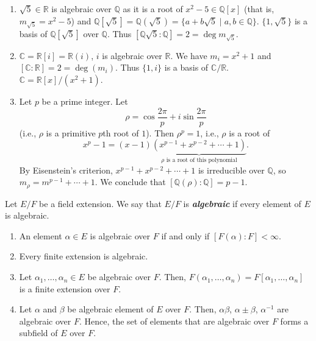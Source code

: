 \documentclass[twoside]{article}
\newcommand\Q{\mathbb Q}
\newcommand\R{\mathbb R}
\newcommand\C{\mathbb C}
\theoremstyle{remark}
\newcommand*\term[1]{\textbf{\textit{\mathversion{bold}#1}}}
\begin{document}
\begin{examples}
  \begin{enumerate}[label=\arabic*.]
    \item \(\sqrt 5 \in \R\) is algebraic over \(\Q\) as it is a root of \(x^2-5 \in \Q[x]\) (that is, \(m_{\sqrt 5} = x^2-5\)) and \(\Q[\sqrt{5}] = \Q(\sqrt{5}) = \{a + b\sqrt 5 \mid a,b \in \Q\}\). \(\{1,\sqrt5\}\) is a basis of \(\Q[\sqrt5]\) over \(\Q\). Thus \([\Q\sqrt5 : \Q] = 2 = \deg m_{\sqrt5}\).
    \item \(\C = \R[i] = \R(i)\), \(i\) is algebraic over \(\R\). We have \(m_i = x^2+1\) and \([\C : \R] = 2 = \deg(m_i)\). Thus \(\{1, i\}\) is a basis of \(\C/\R\). \(\C = \R[x]/(x^2+1)\).
    \item Let \(p\) be a prime integer. Let
    \[ \rho = \cos \frac{2\pi}p + i \sin \frac{2\pi}p \]
    (i.e., \(\rho\) is a primitive \(p\)th root of \(1\)). Then \(\rho^p = 1\), i.e., \(\rho\) is a root of
    \[ x^p-1 = (x-1) \underbrace{(x^{p-1} + x^{p-2} + \cdots + 1)}_{\text{\(\rho\) is a root of this polynomial}}. \]
    By Eisenstein's criterion, \(x^{p-1} + x^{p-2} + \cdots + 1\) is irreducible over \(\Q\), so \(m_\rho = m^{p-1} + \cdots + 1\). We conclude that \([\Q(\rho) : \Q] = p-1\).
  \end{enumerate}
\end{examples}

%
Let \(E/F\) be a field extension. We say that \(E/F\) is \term{algebraic} if every element of \(E\) is algebraic.

\begin{corollary}
  \begin{enumerate}[label=\textup{(\arabic*)}, nosep]
    \item An element \(\alpha \in E\) is algebraic over \(F\) if and only if \([F(\alpha) : F] < \infty\).
    \item Every finite extension is algebraic.
    \item Let \(\alpha_1, \dots, \alpha_n \in E\) be algebraic over \(F\). Then, \(F(\alpha_1, \dots, \alpha_n) = F[\alpha_1, \dots, \alpha_n]\) is a finite extension over \(F\).
    \item Let \(\alpha\) and \(\beta\) be algebraic element of \(E\) over \(F\). Then, \(\alpha\beta\), \(\alpha\pm\beta\), \(\alpha^{-1}\) are algebraic over \(F\). Hence, the set of elements that are algebraic over \(F\) forms a subfield of \(E\) over \(F\).
  \end{enumerate}
\end{corollary}
\end{document}
